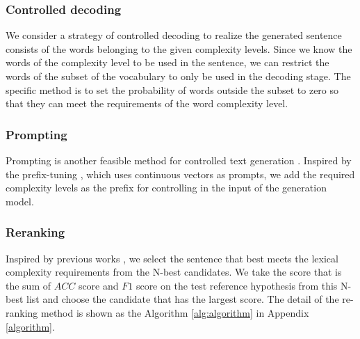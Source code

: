 \documentclass[11pt]{article}
\begin{document}
\subsubsection{Controlled decoding}
We consider a strategy of controlled decoding \cite{dathathri2019plug} to realize the generated sentence consists of the words belonging to the given complexity levels. Since we know the words of the complexity level to be used in the sentence, we can restrict the words of the subset of the vocabulary to only be used in the decoding stage. The specific method is to set the probability of words outside the subset to zero so that they can meet the requirements of the word complexity level.
\subsubsection{Prompting}
Prompting is another feasible method for controlled text generation \cite{zou2021controllable}. Inspired by the prefix-tuning \cite{liang2021prefix}, which uses continuous vectors as prompts, we add the required complexity levels as the prefix for controlling in the input of the generation model. 
\subsubsection{Reranking}
Inspired by previous works \cite{ravaut2022summareranker, pandramish2020checkpoint}, we select the sentence that best meets the lexical complexity requirements from the N-best candidates. We take the score that is the sum of $ACC$ score and $F1$ score on the test reference hypothesis from this N-best list and choose the candidate that has the largest score. The detail of the re-ranking method is shown as the Algorithm \ref{alg:algorithm} in Appendix \ref{algorithm}.
\end{document}
